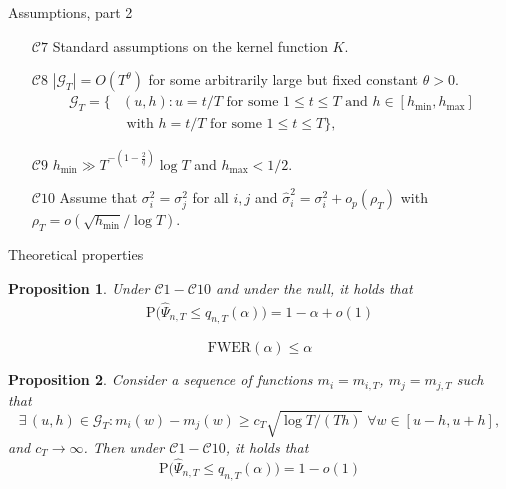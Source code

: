\documentclass[10pt]{beamer}
\newcommand{\Prob}{\mathrm{P}}
\newtheorem{prop}{Proposition}
\begin{document}
\begin{frame}{Assumptions, part 2}
\begin{itemize}
\item[$\mathcal{C}7$]\label{C-ker} Standard assumptions on the kernel function $K$. \pause
\item[$\mathcal{C}8$] \label{C-grid} $|\mathcal{G}_T| = O(T^\theta)$ for some arbitrarily large but fixed constant $\theta > 0$.\pause
\begin{align*}
\mathcal{G}_T = \big\{ & (u,h): u = t/T \text{ for some } 1 \le t \le T \text{ and } h \in [h_{\min},h_{\max}] \\ & \text{ with } h = t/T \text{ for some } 1 \le t \le T  \big\},
\end{align*}\pause
\vspace{-5mm}
\item[$\mathcal{C}9$] \label{C-h} $h_{\min} \gg T^{-(1-\frac{2}{q})} \log T$ and $h_{\max} <1/2$.\pause
\item[$\mathcal{C}10$] Assume that $\sigma_i^2 = \sigma_j^2$ for all $i, j$ and $\widehat{\sigma}_i^2 = \sigma_i^2 + o_p(\rho_T)$ with $\rho_T = o(\sqrt{h_{\min}}/\log T)$.
\end{itemize}
\end{frame}

\begin{frame}{Theoretical properties}
\begin{prop} Under $\mathcal{C}1 - \mathcal{C}10$ and under the null, it holds that 
\vspace{-2mm}
\begin{align*}
\Prob\Big(\widehat{\Psi}_{n, T} \leq q_{n, T}(\alpha)\Big) = 1 - \alpha + o(1)
\end{align*}
\vspace{-5mm}
\end{prop} \pause
\begin{corollary} $$\text{FWER}(\alpha)\leq \alpha$$
\end{corollary} \pause
\begin{prop}\label{prop2}
Consider a sequence of functions $m_{i} = m_{i,T}$, $m_{j} = m_{j, T}$ such that 
\begin{equation*}
\exists \, (u, h)\in \mathcal{G}_{T}:  m_{i}(w) - m_{j}(w) \ge c_T \sqrt{\log T / (T h)} \,\, \forall w \in [u-h, u+h],
\end{equation*} and $c_T \rightarrow \infty$. Then under $\mathcal{C}1 - \mathcal{C}10$, it holds that
\vspace{-2mm}
\begin{equation*}
\Prob\Big( \widehat{\Psi}_{n, T} \leq q_{n, T}(\alpha)\Big) = 1 - o(1)
\end{equation*}
\vspace{-5mm}
\end{prop}
\end{frame}
\end{document}
